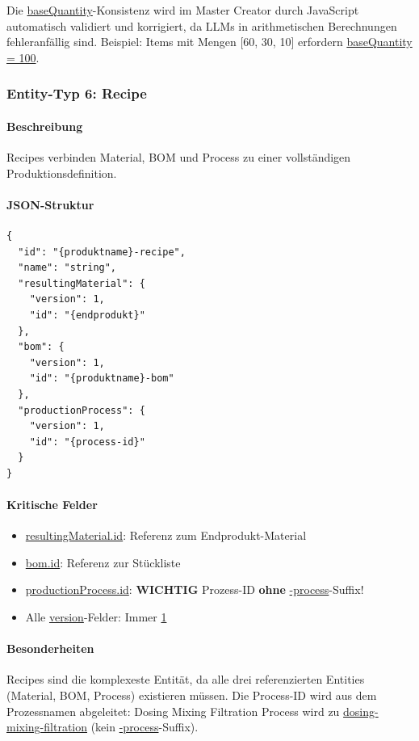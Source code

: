 Die \url{baseQuantity}-Konsistenz wird im Master Creator durch JavaScript automatisch validiert und korrigiert, da LLMs in arithmetischen Berechnungen fehleranfällig sind. Beispiel: Items mit Mengen [60, 30, 10] erfordern \url{baseQuantity = 100}.

\subsubsection{Entity-Typ 6: Recipe}

\paragraph{Beschreibung}

Recipes verbinden Material, BOM und Process zu einer vollständigen Produktionsdefinition.

\paragraph{JSON-Struktur}

\begin{verbatim}
{
  "id": "{produktname}-recipe",
  "name": "string",
  "resultingMaterial": {
    "version": 1,
    "id": "{endprodukt}"
  },
  "bom": {
    "version": 1,
    "id": "{produktname}-bom"
  },
  "productionProcess": {
    "version": 1,
    "id": "{process-id}"
  }
}
\end{verbatim}

\paragraph{Kritische Felder}

\begin{itemize}
    \item \url{resultingMaterial.id}: Referenz zum Endprodukt-Material
    \item \url{bom.id}: Referenz zur Stückliste
    \item \url{productionProcess.id}: \textbf{WICHTIG} Prozess-ID \textbf{ohne} \url{-process}-Suffix!
    \item Alle \url{version}-Felder: Immer \url{1}
\end{itemize}

\paragraph{Besonderheiten}

Recipes sind die komplexeste Entität, da alle drei referenzierten Entities (Material, BOM, Process) existieren müssen. Die Process-ID wird aus dem Prozessnamen abgeleitet: \glqq Dosing Mixing Filtration Process\grqq{} wird zu \url{dosing-mixing-filtration} (kein \url{-process}-Suffix).

